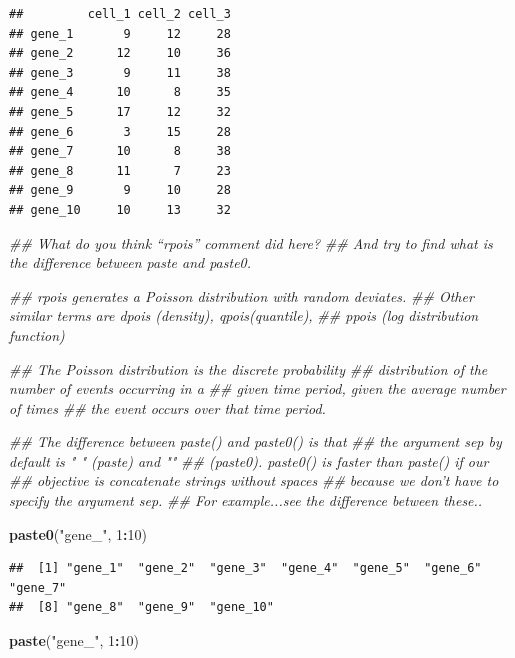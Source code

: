 \documentclass[]{article}
\newenvironment{Shaded}{\begin{snugshade}}{\end{snugshade}}
\newcommand{\CommentTok}[1]{\textcolor[rgb]{0.56,0.35,0.01}{\textit{#1}}}
\newcommand{\DecValTok}[1]{\textcolor[rgb]{0.00,0.00,0.81}{#1}}
\newcommand{\KeywordTok}[1]{\textcolor[rgb]{0.13,0.29,0.53}{\textbf{#1}}}
\newcommand{\NormalTok}[1]{#1}
\newcommand{\OperatorTok}[1]{\textcolor[rgb]{0.81,0.36,0.00}{\textbf{#1}}}
\newcommand{\StringTok}[1]{\textcolor[rgb]{0.31,0.60,0.02}{#1}}
\begin{document}
\begin{verbatim}
##         cell_1 cell_2 cell_3
## gene_1       9     12     28
## gene_2      12     10     36
## gene_3       9     11     38
## gene_4      10      8     35
## gene_5      17     12     32
## gene_6       3     15     28
## gene_7      10      8     38
## gene_8      11      7     23
## gene_9       9     10     28
## gene_10     10     13     32
\end{verbatim}

\begin{Shaded}
\begin{Highlighting}[]
\CommentTok{## What do you think “rpois” comment did here? }
\CommentTok{## And try to find what is the difference between paste and paste0.}

\CommentTok{## rpois generates a Poisson distribution with random deviates. }
\CommentTok{## Other similar terms are dpois (density), qpois(quantile), }
\CommentTok{## ppois (log distribution function)}

\CommentTok{## The Poisson distribution is the discrete probability}
\CommentTok{## distribution of the number of events occurring in a }
\CommentTok{## given time period, given the average number of times }
\CommentTok{## the event occurs over that time period.}

\CommentTok{## The difference between paste() and paste0() is that }
\CommentTok{## the argument sep by default is " " (paste) and "" }
\CommentTok{## (paste0). paste0() is faster than paste() if our }
\CommentTok{## objective is concatenate strings without spaces }
\CommentTok{## because we don’t have to  specify the argument sep. }
\CommentTok{## For example...see the difference between these..}

\KeywordTok{paste0}\NormalTok{(}\StringTok{"gene_"}\NormalTok{, }\DecValTok{1}\OperatorTok{:}\DecValTok{10}\NormalTok{)}
\end{Highlighting}
\end{Shaded}

\begin{verbatim}
##  [1] "gene_1"  "gene_2"  "gene_3"  "gene_4"  "gene_5"  "gene_6"  "gene_7" 
##  [8] "gene_8"  "gene_9"  "gene_10"
\end{verbatim}

\begin{Shaded}
\begin{Highlighting}[]
\KeywordTok{paste}\NormalTok{(}\StringTok{"gene_"}\NormalTok{, }\DecValTok{1}\OperatorTok{:}\DecValTok{10}\NormalTok{)}
\end{Highlighting}
\end{Shaded}
\end{document}
